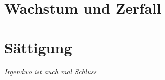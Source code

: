 


\renewcommand{\bbwAufgabenBlockID}{FctWZ}%

\renewcommand{\metaHeaderLine}{Exponentialfunktionen}
\renewcommand{\arbeitsblattTitel}{Aufgaben zu Wachstum und Zerfall}


\arbeitsblattHeader{}




\section{Wachstum und Zerfall}












\section{Sättigung}
\textit{Irgendwo ist auch mal Schluss}








